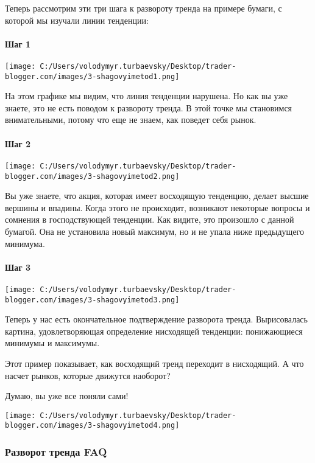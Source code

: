 \documentclass[a5paper]{article}
\begin{document}
Теперь рассмотрим эти три шага к развороту тренда  на примере бумаги,
с которой мы изучали линии тенденции:

\paragraph{Шаг 1}

\texttt{[image: C:/Users/volodymyr.turbaevsky/Desktop/trader-blogger.com/images/3-shagovyimetod1.png]}

На этом графике мы видим, что линия тенденции нарушена. Но как вы уже
знаете, это не есть поводом к  развороту тренда. В этой точке мы
становимся внимательными, потому что еще не знаем, как поведет себя
рынок.

\paragraph{Шаг 2}

\texttt{[image: C:/Users/volodymyr.turbaevsky/Desktop/trader-blogger.com/images/3-shagovyimetod2.png]}

Вы уже знаете, что акция, которая имеет восходящую тенденцию, делает
высшие вершины и впадины. Когда этого не происходит, возникают
некоторые вопросы и сомнения в господствующей тенденции. Как видите,
это произошло с данной бумагой. Она не установила новый максимум, но и
не упала ниже предыдущего минимума.

\paragraph{Шаг 3}

\texttt{[image: C:/Users/volodymyr.turbaevsky/Desktop/trader-blogger.com/images/3-shagovyimetod3.png]}

Теперь у нас есть окончательное подтверждение разворота тренда. Вырисовалась картина, удовлетворяющая определение нисходящей тенденции: понижающиеся минимумы и максимумы.

Этот пример показывает, как восходящий тренд переходит в нисходящий. А что насчет  рынков, которые движутся наоборот?

Думаю, вы уже все поняли сами!

\texttt{[image: C:/Users/volodymyr.turbaevsky/Desktop/trader-blogger.com/images/3-shagovyimetod4.png]}

\subsubsection{Разворот тренда FAQ}
\end{document}
